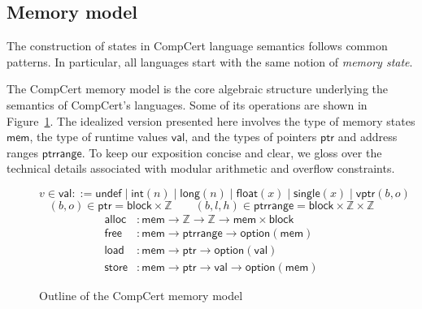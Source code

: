 \documentclass[11pt,oneside]{book}
\theoremstyle{definition}
\newcommand{\kw}[1]{\ensuremath{ \mathsf{#1} }}
\newcommand{\figsize}{}
\begin{document}
\subsection{Memory model} \label{sec:sem:mm} %

The construction of states in CompCert language semantics
follows common patterns.
In particular,
all languages start with
the same notion of \emph{memory state}.

The CompCert memory model \citep{compcertmm,compcertmmv2}
is the core algebraic structure
underlying the semantics of CompCert's languages.
Some of its operations
are shown in Figure~\ref{fig:mm}.
The idealized version presented here
involves
the type of memory states \kw{mem},
the type of runtime values \kw{val}, and
the types of pointers \kw{ptr} and address ranges \kw{ptrrange}.
To keep our exposition concise and clear,
we gloss over the technical details
associated with modular arithmetic and overflow constraints.

\begin{figure} %
  \figsize
  \[
    v \in \kw{val} ::=
          \kw{undef} \mid
          \kw{int}(n) \mid
          \kw{long}(n) \mid
          \kw{float}(x) \mid
          \kw{single}(x) \mid
          \kw{vptr}(b, o)
  \]
  \[
    (b, o) \in \kw{ptr} =
      \kw{block} \times \mathbb{Z}
    \qquad
    (b, l, h) \in \kw{ptrrange} =
      \kw{block} \times \mathbb{Z} \times \mathbb{Z}
  \]
  \begin{align*}
    \kw{alloc} &:
      \kw{mem} \rightarrow \mathbb{Z} \rightarrow \mathbb{Z} \rightarrow
      \kw{mem} \times \kw{block}
    \\
    \kw{free} &:
      \kw{mem} \rightarrow
      \kw{ptrrange} \rightarrow
      \kw{option}(\kw{mem})
    \\
    \kw{load} &:
      \kw{mem} \rightarrow \kw{ptr} \rightarrow \kw{option}(\kw{val})
    \\
    \kw{store} &:
      \kw{mem} \rightarrow \kw{ptr} \rightarrow \kw{val} \rightarrow \kw{option}(\kw{mem})
  \end{align*}
  \caption{Outline of the CompCert memory model}
  \label{fig:mm}
\end{figure}
\end{document}
